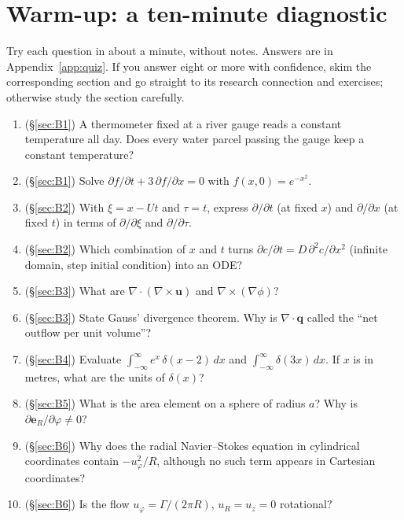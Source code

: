 \documentclass[11pt,letterpaper]{article}
\numberwithin{equation}{section}
\newcommand{\uu}{\mathbf{u}}
\newcommand{\qq}{\mathbf{q}}
\newcommand{\e}[1]{\mathbf{e}_{#1}}
\begin{document}
\clearpage
\section*{Warm-up: a ten-minute diagnostic}
Try each question in about a minute, without notes. Answers are in Appendix~\ref{app:quiz}.
If you answer eight or more with confidence, skim the corresponding section and go straight
to its research connection and exercises; otherwise study the section carefully.

\begin{quizbox}
\begin{enumerate}[label=\textbf{Q\arabic*.},leftmargin=2.4em]
  \item (\S\ref{sec:B1}) A thermometer fixed at a river gauge reads a constant temperature all day. Does every water parcel passing the gauge keep a constant temperature?
  \item (\S\ref{sec:B1}) Solve $\partial f/\partial t+3\,\partial f/\partial x=0$ with $f(x,0)=e^{-x^2}$.
  \item (\S\ref{sec:B2}) With $\xi=x-Ut$ and $\tau=t$, express $\partial/\partial t$ (at fixed $x$) and $\partial/\partial x$ (at fixed $t$) in terms of $\partial/\partial\xi$ and $\partial/\partial\tau$.
  \item (\S\ref{sec:B2}) Which combination of $x$ and $t$ turns $\partial c/\partial t=D\,\partial^2 c/\partial x^2$ (infinite domain, step initial condition) into an ODE?
  \item (\S\ref{sec:B3}) What are $\nabla\cdot(\nabla\times\uu)$ and $\nabla\times(\nabla\phi)$?
  \item (\S\ref{sec:B3}) State Gauss' divergence theorem. Why is $\nabla\cdot\qq$ called the ``net outflow per unit volume''?
  \item (\S\ref{sec:B4}) Evaluate $\int_{-\infty}^{\infty}e^{x}\,\delta(x-2)\,dx$ and $\int_{-\infty}^{\infty}\delta(3x)\,dx$. If $x$ is in metres, what are the units of $\delta(x)$?
  \item (\S\ref{sec:B5}) What is the area element on a sphere of radius $a$? Why is $\partial\e{R}/\partial\varphi\neq 0$?
  \item (\S\ref{sec:B6}) Why does the radial Navier--Stokes equation in cylindrical coordinates contain $-u_\varphi^2/R$, although no such term appears in Cartesian coordinates?
  \item (\S\ref{sec:B6}) Is the flow $u_\varphi=\Gamma/(2\pi R)$, $u_R=u_z=0$ rotational?
\end{enumerate}
\end{quizbox}
\end{document}
